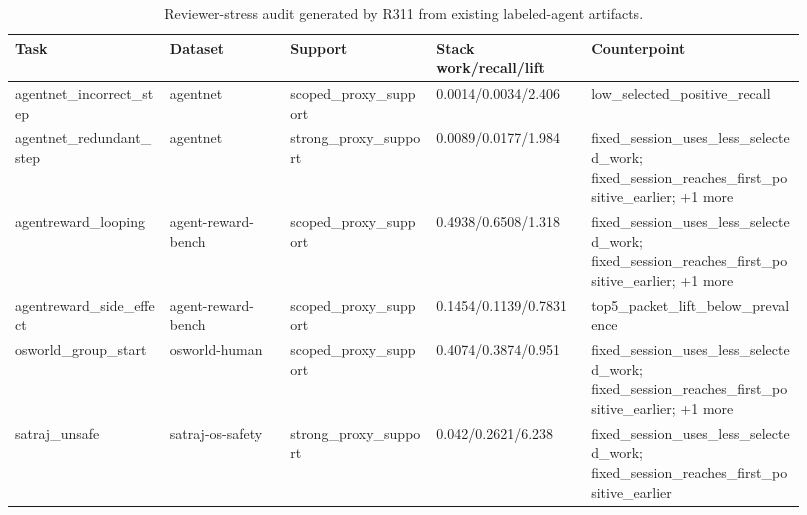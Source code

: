 \begin{table}[t]
  \centering
  \scriptsize
  \caption{Reviewer-stress audit generated by R311 from existing labeled-agent artifacts.}
  \label{tab:r311-robustness-audit}
  \begin{tabular}{p{0.18\linewidth}p{0.14\linewidth}p{0.17\linewidth}p{0.18\linewidth}p{0.25\linewidth}}
    \toprule
    Task & Dataset & Support & Stack work/recall/lift & Counterpoint \\
    \midrule
    agentnet\_incorrect\_step & agentnet & scoped\_proxy\_support & 0.0014/0.0034/2.406 & low\_selected\_positive\_recall \\
    agentnet\_redundant\_step & agentnet & strong\_proxy\_support & 0.0089/0.0177/1.984 & fixed\_session\_uses\_less\_selected\_work; fixed\_session\_reaches\_first\_positive\_earlier; +1 more \\
    agentreward\_looping & agent-reward-bench & scoped\_proxy\_support & 0.4938/0.6508/1.318 & fixed\_session\_uses\_less\_selected\_work; fixed\_session\_reaches\_first\_positive\_earlier; +1 more \\
    agentreward\_side\_effect & agent-reward-bench & scoped\_proxy\_support & 0.1454/0.1139/0.7831 & top5\_packet\_lift\_below\_prevalence \\
    osworld\_group\_start & osworld-human & scoped\_proxy\_support & 0.4074/0.3874/0.951 & fixed\_session\_uses\_less\_selected\_work; fixed\_session\_reaches\_first\_positive\_earlier; +1 more \\
    satraj\_unsafe & satraj-os-safety & strong\_proxy\_support & 0.042/0.2621/6.238 & fixed\_session\_uses\_less\_selected\_work; fixed\_session\_reaches\_first\_positive\_earlier \\
    \bottomrule
  \end{tabular}
\end{table}
